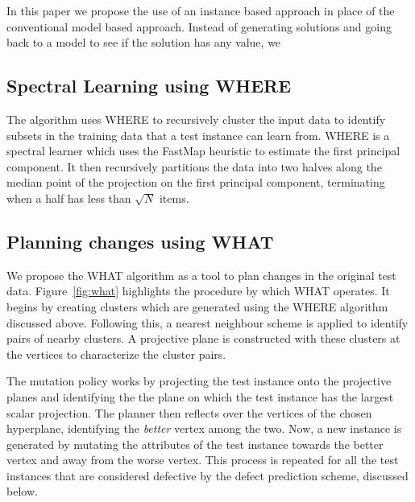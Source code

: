 \documentclass[conference]{IEEEtran}
\begin{document}
In this paper we propose the use of an instance based approach in place of the conventional model based approach. Instead of generating solutions and going back to a model to see if the solution has any value, we 

\subsection{Spectral Learning using WHERE}
The algorithm uses WHERE to recursively cluster the input data to identify subsets in the training data that a test instance can learn from. WHERE is a spectral learner which uses the FastMap heuristic to estimate the first principal component. It then recursively partitions the data into two halves along the median point of the projection on the first principal component, terminating when a half has less than $\sqrt{N}$ items.   

\subsection{Planning changes using WHAT}
We propose the WHAT algorithm as a tool to plan changes in the original test data. Figure~\ref{fig:what} highlights the procedure by which WHAT operates. It begins by creating clusters which are generated using the WHERE algorithm discussed above. Following this, a nearest neighbour scheme is applied to identify pairs of nearby clusters. A projective plane is constructed with these clusters at the vertices to characterize the cluster pairs.

The mutation policy works by projecting the test instance onto the projective planes and identifying the the plane on which the test instance has the largest scalar projection. The planner then reflects over the vertices of the chosen hyperplane, identifying the \textit{better} vertex among the two. Now, a new instance is generated by mutating the attributes of the test instance towards the better vertex and away from the worse vertex. This process is repeated for all the test instances that are considered defective by the defect prediction scheme, discussed below.
\end{document}
